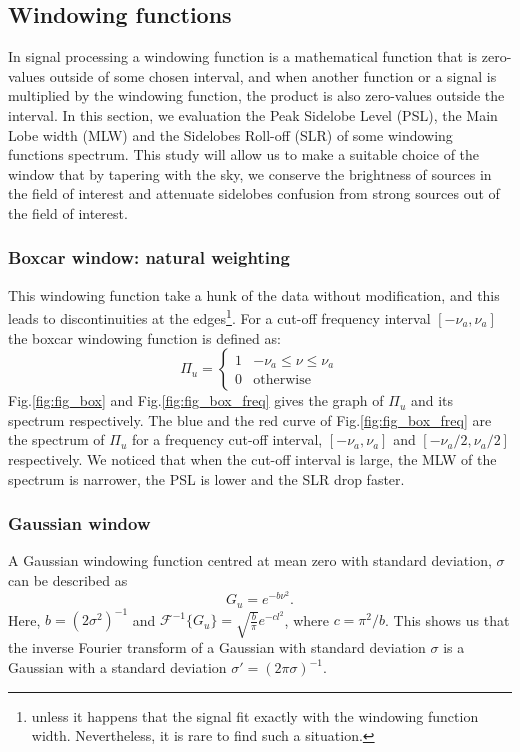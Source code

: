 \documentclass[useAMS,usenatbib]{mn2e}
\begin{document}
\subsection{Windowing functions}
In signal processing a windowing function is a mathematical function that is zero-values outside of some chosen interval, and when another 
function or a signal is multiplied by the windowing function, the product is also zero-values outside the interval.
In this section, we evaluation the Peak Sidelobe Level (PSL), the Main 
Lobe width (MLW) and the Sidelobes Roll-off (SLR) of some windowing functions spectrum. This study will allow us to make 
a suitable choice of the window that by tapering with the sky, we conserve the brightness of sources in the field of 
interest and attenuate sidelobes confusion from strong sources out of the field of interest.
\subsubsection{Boxcar window: natural weighting}
This windowing function take a hunk of the data without modification, and  this leads to discontinuities at the edges\footnote{unless it 
happens that the signal  fit exactly with the windowing function width. Nevertheless, it is rare to find such a situation.}. For 
a cut-off frequency interval  $[-\nu_a,\nu_a]$ the boxcar windowing function is defined as:
\begin{equation}
\Pi_{u}=\left\{
\begin{array}{rl}
1 & \mbox{$-\nu_a \leq \nu \leq \nu_a$} \\
0 & \mbox{otherwise}
\end{array}\right.
\end{equation}
Fig.\ref{fig:fig_box} and Fig.\ref{fig:fig_box_freq} gives the graph of $\Pi_{u}$ and its spectrum respectively. The blue and 
the red curve of Fig.\ref{fig:fig_box_freq} are the spectrum of $\Pi_{u}$ for a frequency cut-off interval, $[-\nu_a,\nu_a]$ and 
$[-\nu_a/2,\nu_a/2]$ respectively. We noticed that when the cut-off interval is large, the MLW of the spectrum is 
narrower, the PSL is lower and the SLR drop faster. 
\subsubsection{Gaussian window}
A Gaussian windowing function centred at mean zero with standard deviation, $\sigma$ can be described as 
\begin{equation}
  G_{u}= e^{-b\nu^{2}}.
\end{equation}
Here, $b=(2\sigma^2)^{-1}$ and  $\mathcal{F}^{-1}\big\{G_{u}\big\}=\sqrt{\frac{b}{\pi}}e^{-cl^2}$, where $c=\pi^2/b$.
This shows us that the inverse Fourier transform of a Gaussian with standard deviation $\sigma$ is a Gaussian with a standard 
deviation $\sigma '= (2\pi\sigma)^{-1}$. 
\end{document}
